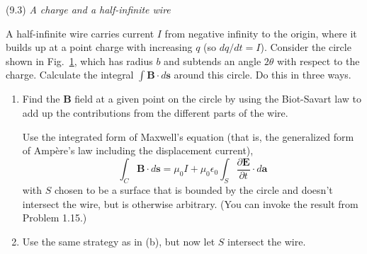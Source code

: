 \documentclass{article}
\begin{document}

\begin{homeworkProblem}
	(9.3) \textit{A charge and a half-infinite wire}

	A half-infinite wire carries current $I$ from negative infinity to the origin, where it builds up at a point charge with increasing $q$ (so $dq/dt=I$). Consider the circle shown in Fig.~\ref{fig:wire}, which has radius $b$ and subtends an angle $2\theta$ with respect to the charge. Calculate the integral $\int\mathbf{B}\cdot d\mathbf{s}$ around this circle. Do this in three ways.
	\begin{figure}[H]
		\centering
		\caption{}\label{fig:wire}
	\end{figure}
	\begin{enumerate}[label= (\alph*)]
		\item Find the $\mathbf{B}$ field at a given point on the circle by using the Biot-Savart law to add up the contributions from the different parts of the wire.
		\begin{item}
			Use the integrated form of Maxwell's equation (that is, the generalized form of Amp\`{e}re's law including the displacement current),
			\begin{equation}\tag{9.59}
				\int_C\mathbf{B}\cdot d\mathbf{s}=\mu_0 I+\mu_0\epsilon_0\int_S\frac{\partial\mathbf{E}}{\partial t}\cdot d\mathbf{a}
			\end{equation}
			with $S$ chosen to be a surface that is bounded by the circle and doesn't intersect the wire, but is otherwise arbitrary. (You can invoke the result from Problem 1.15.)
		\end{item}
		\item Use the same strategy as in (b), but now let $S$ intersect the wire.
	\end{enumerate}


\end{homeworkProblem}
\end{document}
